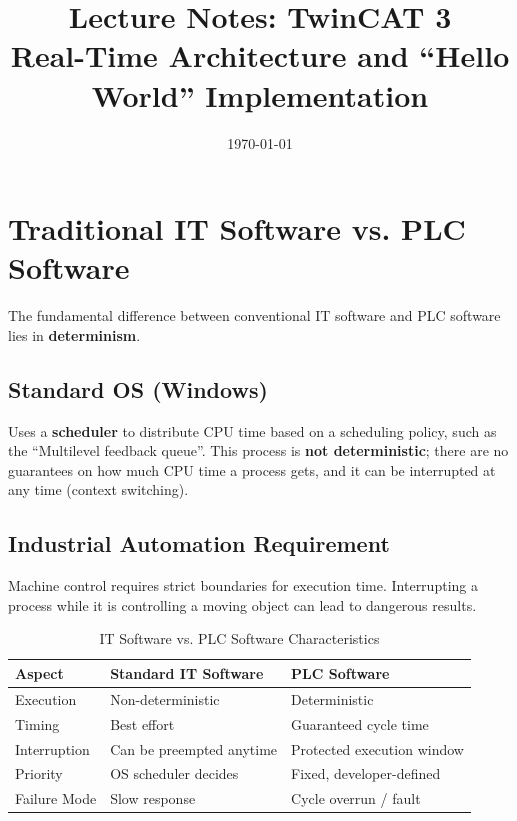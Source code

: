 \documentclass[11pt,a4paper]{article}
\title{
    \vspace{-1cm}
    \textbf{Lecture Notes: TwinCAT 3}\\
    \Large Real-Time Architecture and ``Hello World'' Implementation
}
\author{}
\date{\today}
\begin{document}
\maketitle

\tableofcontents
\newpage

\section{Traditional IT Software vs. PLC Software}

The fundamental difference between conventional IT software and PLC software lies in \textbf{determinism}.

\subsection{Standard OS (Windows)}

Uses a \textbf{scheduler} to distribute CPU time based on a scheduling policy, such as the ``Multilevel feedback queue''. This process is \textbf{not deterministic}; there are no guarantees on how much CPU time a process gets, and it can be interrupted at any time (context switching).

\subsection{Industrial Automation Requirement}

Machine control requires strict boundaries for execution time. Interrupting a process while it is controlling a moving object can lead to dangerous results.

\begin{table}[h]
\centering
\begin{tabular}{@{}lll@{}}
\toprule
\textbf{Aspect} & \textbf{Standard IT Software} & \textbf{PLC Software} \\
\midrule
Execution & Non-deterministic & Deterministic \\
Timing & Best effort & Guaranteed cycle time \\
Interruption & Can be preempted anytime & Protected execution window \\
Priority & OS scheduler decides & Fixed, developer-defined \\
Failure Mode & Slow response & Cycle overrun / fault \\
\bottomrule
\end{tabular}
\caption{IT Software vs. PLC Software Characteristics}
\end{table}
\end{document}
